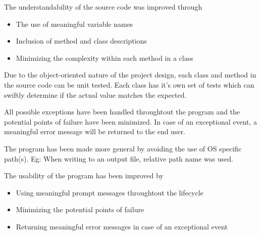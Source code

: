     \begin{flushleft}
      The understandability of the source code was improved through
      \begin{itemize}
        \item {The use of meaningful variable names}
        \item {Inclusion of method and class descriptions}
        \item {Minimizing the complexity within each method in a class}
      \end{itemize}
    \end{flushleft}

    \begin{flushleft}
      Due to the object-oriented nature of the project design, each class and method in the source code can be unit tested. Each class has it's own set of tests which can swiftly determine if the actual value matches the expected.
    \end{flushleft}

  \begin{flushleft}
    All possible exceptions have been handled throughtout the program and the potential points of failure have been minimized. In case of an exceptional event, a meaningful error message will be returned to the end user.
  \end{flushleft}

    \begin{flushleft}
      The program has been made more general by avoiding the use of OS specific path(s). Eg: When writing to an output file, relative path name was used.
    \end{flushleft}

    \begin{flushleft}
      The usability of the program has been improved by 
      \begin{itemize}
        \item {Using meaningful prompt messages throughtout the lifecycle }
        \item {Minimizing the potential points of failure }
        \item {Returning meaningful error messages in case of an exceptional event}
      \end{itemize}
    \end{flushleft}

